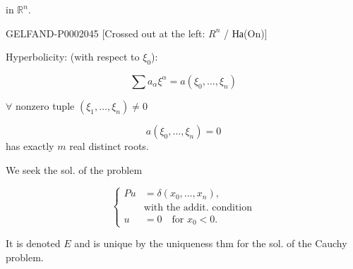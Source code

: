 in $\mathbb R^n$.






\begin{GelfandAdjacentEvidence}{GELFAND-P000204}{5}
[Crossed out at the left: $R^n$ / На(On)]
\end{GelfandAdjacentEvidence}

Hyperbolicity: (with respect to $\xi_0$):



\begin{equation*}\sum a_\alpha\xi^\alpha=a (\xi_0,\ldots,\xi_n)\end{equation*}



$\forall$ nonzero tuple $(\xi_1,\ldots,\xi_n)\ne0$



\begin{equation*}a (\xi_0,\ldots,\xi_n)=0\end{equation*}
has exactly $m$ real distinct roots.



We seek the sol. of the problem



\begin{equation*}\left\{\begin{aligned}
Pu&=\delta (x_0,\ldots, x_n),\\
&\text{with the addit. condition}\\
u&=0\quad\text{for }x_0<0.
\end{aligned}\right.\end{equation*}



It is denoted $E$ and is unique by the uniqueness thm for the sol. of the Cauchy problem.



